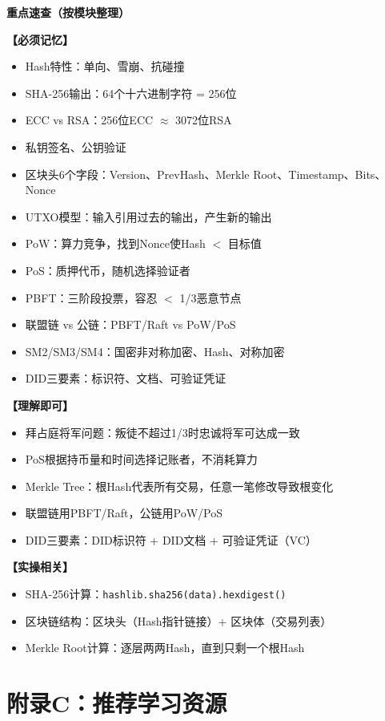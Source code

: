 ﻿\documentclass[12pt,a4paper]{article}
\begin{document}
\begin{theorybox}
\textbf{重点速查（按模块整理）}

\textbf{【必须记忆】}
\begin{itemize}
\item Hash特性：单向、雪崩、抗碰撞
\item SHA-256输出：64个十六进制字符 = 256位
\item ECC vs RSA：256位ECC $\approx$ 3072位RSA
\item 私钥签名、公钥验证
\item 区块头6个字段：Version、PrevHash、Merkle Root、Timestamp、Bits、Nonce
\item UTXO模型：输入引用过去的输出，产生新的输出
\item PoW：算力竞争，找到Nonce使Hash $<$ 目标值
\item PoS：质押代币，随机选择验证者
\item PBFT：三阶段投票，容忍 $<$ 1/3恶意节点
\item 联盟链 vs 公链：PBFT/Raft vs PoW/PoS
\item SM2/SM3/SM4：国密非对称加密、Hash、对称加密
\item DID三要素：标识符、文档、可验证凭证
\end{itemize}

\textbf{【理解即可】}
\begin{itemize}
\item 拜占庭将军问题：叛徒不超过1/3时忠诚将军可达成一致
\item PoS根据持币量和时间选择记账者，不消耗算力
\item Merkle Tree：根Hash代表所有交易，任意一笔修改导致根变化
\item 联盟链用PBFT/Raft，公链用PoW/PoS
\item DID三要素：DID标识符 + DID文档 + 可验证凭证（VC）
\end{itemize}

\textbf{【实操相关】}
\begin{itemize}
\item SHA-256计算：\texttt{hashlib.sha256(data).hexdigest()}
\item 区块链结构：区块头（Hash指针链接）+ 区块体（交易列表）
\item Merkle Root计算：逐层两两Hash，直到只剩一个根Hash
\end{itemize}
\end{theorybox}

\section{附录C：推荐学习资源}
\end{document}

